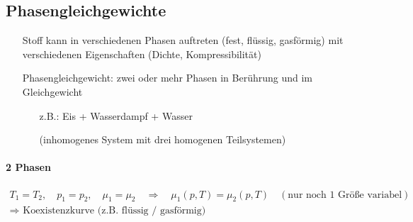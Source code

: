 \subsection{Phasengleichgewichte}
\begin{itemize}
    \item[] Stoff kann in verschiedenen Phasen auftreten (fest, flüssig, gasförmig) mit verschiedenen Eigenschaften (Dichte, Kompressibilität)
    \item[] Phasengleichgewicht: zwei oder mehr Phasen in Berührung und im Gleichgewicht
    \begin{itemize}
        \item[z.B.:] Eis + Wasserdampf + Wasser
        \item[] (inhomogenes System mit drei homogenen Teilsystemen)
    \end{itemize}
\end{itemize}

\paragraph{2 Phasen}
\begin{align}
    T_1 = T_2, \quad p_1 = p_2, \quad \mu_1 = \mu_2 \quad \Rightarrow \quad \mu_1(p,T) = \mu_2(p,T) \quad (\text{nur noch 1 Größe variabel})\\
    \Longrightarrow \text{ Koexistenzkurve (z.B. flüssig / gasförmig)}
\end{align}
\begin{center}
\end{center}

